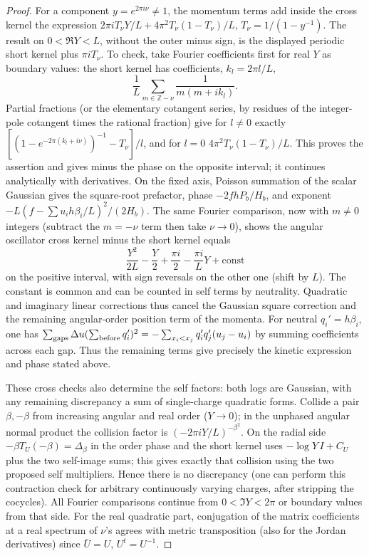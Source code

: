 \documentclass[11pt]{article}
\numberwithin{equation}{section}
\theoremstyle{definition}\newtheorem{definition}[theorem]{Definition}
\theoremstyle{remark}\newtheorem{remark}[theorem]{Remark}
\begin{document}
\begin{proof}
For a component \(y=e^{2\pi i\nu}\ne1\), the momentum terms add inside the cross kernel the expression \(2\pi i T_\nu Y/L+4\pi^2 T_\nu(1-T_\nu)/L\), \(T_\nu=1/(1-y^{-1})\). The result on \(0<\Re Y<L\), without the outer minus sign, is the displayed periodic short kernel plus \(\pi i T_\nu\). To check, take Fourier coefficients first for real \(Y\) as boundary values: the short kernel has coefficients, \(k_l=2\pi l/L\),
\[
 \frac1L\sum_{m\in\mathbb Z-\nu}\frac1{m(m+i k_l)}.
\]
Partial fractions (or the elementary cotangent series, by residues of the integer-pole cotangent times the rational fraction) give for \(l\ne0\) exactly \([(1-e^{-2\pi(k_l+i\nu)})^{-1}-T_\nu]/l\), and for \(l=0\) \(4\pi^2 T_\nu(1-T_\nu)/L\). This proves the assertion and gives minus the phase on the opposite interval; it continues analytically with derivatives. On the fixed axis, Poisson summation of the scalar Gaussian gives the square-root prefactor, phase \(-2 f hP_b/H_b\), and exponent \(-L(f-\sum u_i h\beta_i/L)^2/(2H_b)\). The same Fourier comparison, now with \(m\ne0\) integers (subtract the \(m=-\nu\) term then take \(\nu\to0\)), shows the angular oscillator cross kernel minus the short kernel equals
\[
 \frac{Y^2}{2L}-\frac Y2+\frac{\pi i}2-\frac{\pi i}{L}Y+\mathrm{const}
\]
on the positive interval, with sign reversals on the other one (shift by \(L\)). The constant is common and can be counted in self terms by neutrality. Quadratic and imaginary linear corrections thus cancel the Gaussian square correction and the remaining angular-order position term of the momenta. For neutral \(q_i'=h\beta_i\), one has \(\sum_{\rm gaps}\Delta u(\sum_{\rm before}q_i')^2=-\sum_{x_i<x_j}q_i'q_j'(u_j-u_i)\) by summing coefficients across each gap. Thus the remaining terms give precisely the kinetic expression and phase stated above.

These cross checks also determine the self factors: both logs are Gaussian, with any remaining discrepancy a sum of single-charge quadratic forms. Collide a pair \(\beta,-\beta\) from increasing angular and real order (\(Y\to0\)); in the unphased angular normal product the collision factor is \((-2\pi iY/L)^{-\beta^2}\). On the radial side \(-\beta T_U(-\beta)=\Delta_\beta\) in the order phase and the short kernel uses \(-\log Y\,I+C_U\) plus the two self-image sums; this gives exactly that collision using the two proposed self multipliers. Hence there is no discrepancy (one can perform this contraction check for arbitrary continuously varying charges, after stripping the cocycles). All Fourier comparisons continue from \(0<\Im Y<2\pi\) or boundary values from that side. For the real quadratic part, conjugation of the matrix coefficients at a real spectrum of \(\nu\)'s agrees with metric transposition (also for the Jordan derivatives) since \(\bar U=U\), \(U^t=U^{-1}\).

\end{proof}
\end{document}

